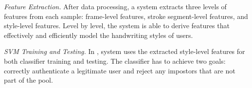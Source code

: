 \emph{Feature Extraction.} After data processing, a \CiT system extracts three levels of features from each sample: frame-level features, stroke segment-level features, and style-level features. Level by level, the \CiT system is able to derive features that effectively and efficiently model the handwriting styles of users. 

\emph{SVM Training and Testing.}
In , \CiT system uses the extracted style-level features for both classifier training and testing. The classifier has to achieve two goals: correctly authenticate a legitimate user and reject any impostors that are not part of the pool. %







